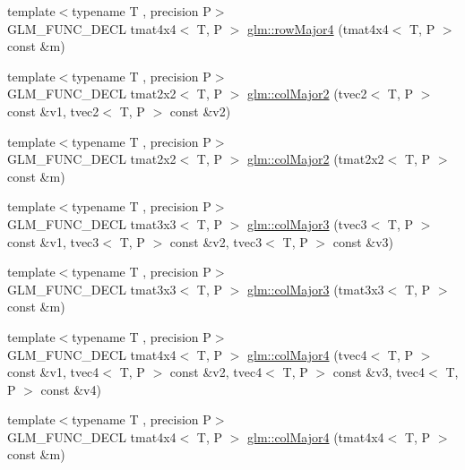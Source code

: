 \begin{DoxyCompactItemize}
\item 
{\footnotesize template$<$typename T , precision P$>$ }\\G\-L\-M\-\_\-\-F\-U\-N\-C\-\_\-\-D\-E\-C\-L tmat4x4$<$ T, P $>$ \hyperlink{group__gtx__matrix__major__storage_ga85771a88c114a088a0414bcfce55e729}{glm\-::row\-Major4} (tmat4x4$<$ T, P $>$ const \&m)
\item 
{\footnotesize template$<$typename T , precision P$>$ }\\G\-L\-M\-\_\-\-F\-U\-N\-C\-\_\-\-D\-E\-C\-L tmat2x2$<$ T, P $>$ \hyperlink{group__gtx__matrix__major__storage_ga599fff4f1c65912b256a82138ebcca37}{glm\-::col\-Major2} (tvec2$<$ T, P $>$ const \&v1, tvec2$<$ T, P $>$ const \&v2)
\item 
{\footnotesize template$<$typename T , precision P$>$ }\\G\-L\-M\-\_\-\-F\-U\-N\-C\-\_\-\-D\-E\-C\-L tmat2x2$<$ T, P $>$ \hyperlink{group__gtx__matrix__major__storage_ga5cfd25de9d5b4c6a825085f38ddfeff7}{glm\-::col\-Major2} (tmat2x2$<$ T, P $>$ const \&m)
\item 
{\footnotesize template$<$typename T , precision P$>$ }\\G\-L\-M\-\_\-\-F\-U\-N\-C\-\_\-\-D\-E\-C\-L tmat3x3$<$ T, P $>$ \hyperlink{group__gtx__matrix__major__storage_ga3a55e2948193e91733e434e7cc3c1540}{glm\-::col\-Major3} (tvec3$<$ T, P $>$ const \&v1, tvec3$<$ T, P $>$ const \&v2, tvec3$<$ T, P $>$ const \&v3)
\item 
{\footnotesize template$<$typename T , precision P$>$ }\\G\-L\-M\-\_\-\-F\-U\-N\-C\-\_\-\-D\-E\-C\-L tmat3x3$<$ T, P $>$ \hyperlink{group__gtx__matrix__major__storage_gaa93f3dcc47ced18e5db4a853363d9386}{glm\-::col\-Major3} (tmat3x3$<$ T, P $>$ const \&m)
\item 
{\footnotesize template$<$typename T , precision P$>$ }\\G\-L\-M\-\_\-\-F\-U\-N\-C\-\_\-\-D\-E\-C\-L tmat4x4$<$ T, P $>$ \hyperlink{group__gtx__matrix__major__storage_ga2829de096bb67ab5cd670958f3d402b6}{glm\-::col\-Major4} (tvec4$<$ T, P $>$ const \&v1, tvec4$<$ T, P $>$ const \&v2, tvec4$<$ T, P $>$ const \&v3, tvec4$<$ T, P $>$ const \&v4)
\item 
{\footnotesize template$<$typename T , precision P$>$ }\\G\-L\-M\-\_\-\-F\-U\-N\-C\-\_\-\-D\-E\-C\-L tmat4x4$<$ T, P $>$ \hyperlink{group__gtx__matrix__major__storage_ga7592acfd27da055e2d7c39564cf8803d}{glm\-::col\-Major4} (tmat4x4$<$ T, P $>$ const \&m)
\end{DoxyCompactItemize}



